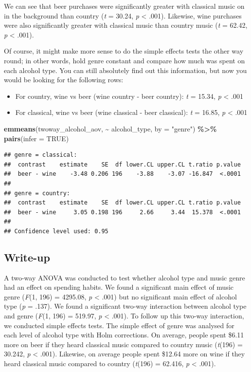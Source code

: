 \documentclass[
]{book}
\newenvironment{Shaded}{\begin{snugshade}}{\end{snugshade}}
\newcommand{\AttributeTok}[1]{\textcolor[rgb]{0.13,0.29,0.53}{#1}}
\newcommand{\ConstantTok}[1]{\textcolor[rgb]{0.56,0.35,0.01}{#1}}
\newcommand{\FunctionTok}[1]{\textcolor[rgb]{0.13,0.29,0.53}{\textbf{#1}}}
\newcommand{\NormalTok}[1]{#1}
\newcommand{\SpecialCharTok}[1]{\textcolor[rgb]{0.81,0.36,0.00}{\textbf{#1}}}
\newcommand{\StringTok}[1]{\textcolor[rgb]{0.31,0.60,0.02}{#1}}
\providecommand{\tightlist}{%
  \setlength{\itemsep}{0pt}\setlength{\parskip}{0pt}}
\begin{document}
We can see that beer purchases were significantly greater with classical music on in the background than country (\emph{t} = 30.24, \emph{p} \textless{} .001). Likewise, wine purchases were also significantly greater with classical music than country music (\emph{t} = 62.42, \emph{p} \textless{} .001).

Of course, it might make more sense to do the simple effects tests the other way round; in other words, hold genre constant and compare how much was spent on each alcohol type. You can still absolutely find out this information, but now you would be looking for the following rows:

\begin{itemize}
\tightlist
\item
  For country, wine vs beer (wine country - beer country): \emph{t} = 15.34, \emph{p} \textless{} .001
\item
  For classical, wine vs beer (wine classical - beer classical): \emph{t} = 16.85, \emph{p} \textless{} .001
\end{itemize}

\begin{Shaded}
\begin{Highlighting}[]
\FunctionTok{emmeans}\NormalTok{(twoway\_alcohol\_aov, }\SpecialCharTok{\textasciitilde{}}\NormalTok{ alcohol\_type, }\AttributeTok{by =} \StringTok{"genre"}\NormalTok{) }\SpecialCharTok{\%\textgreater{}\%}
  \FunctionTok{pairs}\NormalTok{(}\AttributeTok{infer =} \ConstantTok{TRUE}\NormalTok{) }
\end{Highlighting}
\end{Shaded}

\begin{verbatim}
## genre = classical:
##  contrast    estimate    SE  df lower.CL upper.CL t.ratio p.value
##  beer - wine    -3.48 0.206 196    -3.88    -3.07 -16.847  <.0001
## 
## genre = country:
##  contrast    estimate    SE  df lower.CL upper.CL t.ratio p.value
##  beer - wine     3.05 0.198 196     2.66     3.44  15.378  <.0001
## 
## Confidence level used: 0.95
\end{verbatim}

\subsection{Write-up}\label{write-up}

A two-way ANOVA was conducted to test whether alcohol type and music genre had an effect on spending habits. We found a significant main effect of music genre (\emph{F}(1, 196) = 4295.08, \emph{p} \textless{} .001) but no significant main effect of alcohol type (\emph{p} = .137). We found a significant two-way interaction between alcohol type and genre (\emph{F}(1, 196) = 519.97, \emph{p} \textless{} .001). To follow up this two-way interaction, we conducted simple effects tests. The simple effect of genre was analysed for each level of alcohol type with Holm corrections. On average, people spent \$6.11 more on beer if they heard classical music compared to country music (\emph{t}(196) = 30.242, \emph{p} \textless{} .001). Likewise, on average people spent \$12.64 more on wine if they heard classical music compared to country (\emph{t}(196) = 62.416, \emph{p} \textless{} .001).
\end{document}
